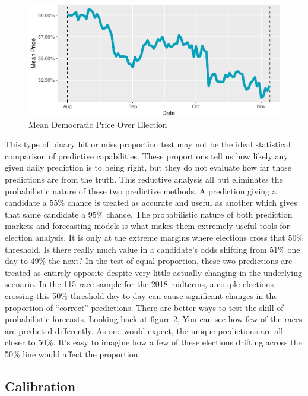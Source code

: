 \documentclass[11pt,]{article}
\begin{document}
\begin{figure}
\centering
\includegraphics{paper_files/figure-latex/plot_mean_price-1.pdf}
\caption{Mean Democratic Price Over Election}
\end{figure}

This type of binary hit or miss proportion test may not be the ideal
statistical comparison of predictive capabilities. These proportions
tell us how likely any given daily prediction is to being right, but
they do not evaluate how far those predictions are from the truth. This
reductive analysis all but eliminates the probabilistic nature of these
two predictive methods. A prediction giving a candidate a 55\% chance is
treated as accurate and useful as another which gives that same
candidate a 95\% chance. The probabilistic nature of both prediction
markets and forecasting models is what makes them extremely useful tools
for election analysis. It is only at the extreme margins where elections
cross that 50\% threshold. Is there really much value in a candidate's
odds shifting from 51\% one day to 49\% the next? In the test of equal
proportion, these two predictions are treated as entirely opposite
despite very little actually changing in the underlying scenario. In the
115 race sample for the 2018 midterms, a couple elections crossing this
50\% threshold day to day can cause significant changes in the
proportion of ``correct'' predictions. There are better ways to test the
skill of probabilistic forecasts. Looking back at figure 2, You can see
how few of the races are predicted differently. As one would expect, the
unique predictions are all closer to 50\%. It's easy to imagine how a
few of these elections drifting across the 50\% line would affect the
proportion.

\hypertarget{calibration}{%
\subsection{Calibration}\label{calibration}}
\end{document}
